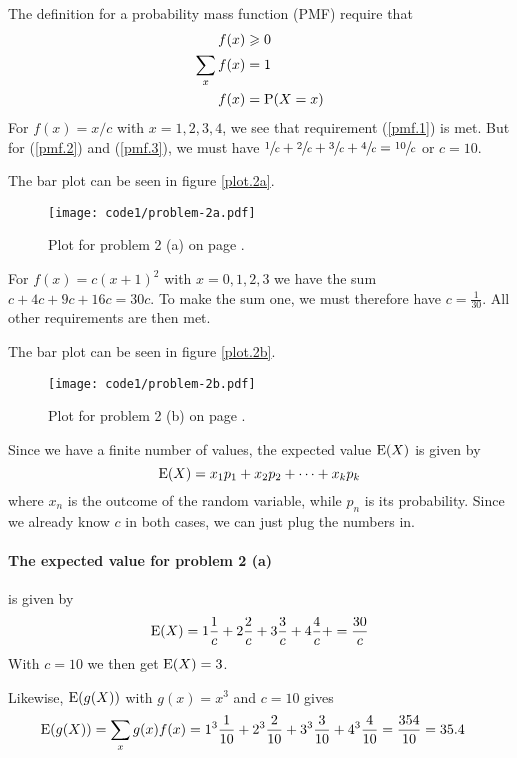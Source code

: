 \documentclass[a4paper,english,12pt]{article}
\begin{document}
The definition for a probability mass function (PMF) require that
\begin{align}
  f(x) &\geqslant 0 \label{pmf.1} \\
  \sum_x{f(x)} &= 1 \label{pmf.2} \\
  f(x) &= \mathrm{P}(X=x) \label{pmf.3}
\end{align}
For $f(x) = x/c$ with $x=1,2,3,4$, we see that requirement (\ref{pmf.1}) is met.
But for (\ref{pmf.2}) and (\ref{pmf.3}), we must have
$\sfrac{1}{c} + \sfrac{2}{c} + \sfrac{3}{c} + \sfrac{4}{c} = \sfrac{10}{c}$
or $c=10$.

The bar plot can be seen in figure \vref{plot.2a}.
\begin{figure}[H]
  \texttt{[image: code1/problem-2a.pdf]}
  \caption{Plot for problem 2 (a) on page \pageref{problem.2 (a)}.}
  \label{plot.2a}
\end{figure}

For $f(x) = c(x+1)^2$ with $x=0,1,2,3$ we have the sum $c+4c+9c+16c=30c$.  To
make the sum one, we must therefore have $c=\frac{1}{30}$. All other
requirements are then met.

The bar plot can be seen in figure \vref{plot.2b}.
\begin{figure}[H]
  \texttt{[image: code1/problem-2b.pdf]}
  \caption{Plot for problem 2 (b) on page \pageref{problem.2 (b)}.}
  \label{plot.2b}
\end{figure}

Since we have a finite number of values, the expected value $\mathrm{E}(X)$ is given by
\[
  \mathrm{E}(X) = x_1p_1 + x_2p_2 + \cdots + x_kp_k
\]
where $x_n$ is the outcome of the random variable, while $p_n$ is its
probability. Since we already know $c$ in both cases, we can just plug the
numbers in.

\paragraph{The expected value for problem 2 (a)} is given by
\[
  \mathrm{E}(X) =
      1\frac{1}{c} +
      2\frac{2}{c} +
      3\frac{3}{c} +
      4\frac{4}{c} +
      = \frac{30}{c}
\]
With $c=10$ we then get $\mathrm{E}(X) = 3$.

Likewise, $\mathrm{E}(g(X))$ with $g(x)=x^3$ and $c=10$ gives
\begin{align*}
  \mathrm{E}(g(X)) &= \sum_x{g(x)f(x)} =
    1^3\frac{1}{10} +
    2^3\frac{2}{10} +
    3^3\frac{3}{10} +
    4^3\frac{4}{10} =
    \frac{354}{10} = 35.4
\end{align*}
\end{document}
